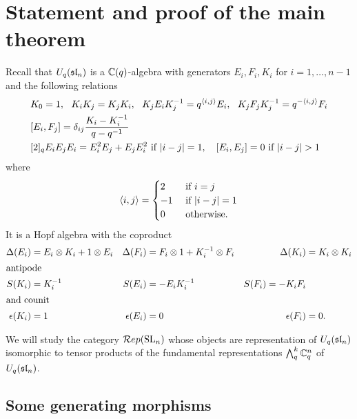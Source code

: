 \documentclass[11pt,leqno]{article}
\begin{document}
\section{Statement and proof of the main theorem}\label{sec:theorem}

Recall that $U_q(\sl_n) $ is a $ \bC(q)$-algebra with generators $ E_i, F_i, K_i $ for $ i = 1, \dots, n-1 $ and the following relations
\begin{align*}
& K_0=1, \ \ K_iK_j=K_jK_i, \ \ K_jE_iK_j^{-1} = q^{\la i,j \ra} E_i, \ \  K_jF_jK_j^{-1} = q^{-\la i,j \ra} F_i \\
& [E_i,F_j] = \delta_{ij} \frac{K_i - K_i^{-1}}{q-q^{-1}} \\
& [2]_q E_iE_jE_i = E_i^2E_j + E_jE_i^2 \text{ if } |i-j| = 1, \ \ \ [E_i,E_j]=0 \text{ if } |i-j|>1
\end{align*}
where 
$$\la i,j \ra = \begin{cases} 2 & \text{ if } i = j \\ -1 & \text{ if } |i-j|=1 \\ 0 & \text{ otherwise. } \end{cases}$$
It is a Hopf algebra with the coproduct
\begin{align} \label{eq:Hopf}
\Delta(E_i) & = E_i \otimes K_i + 1 \otimes E_i & \Delta(F_i) &= F_i \otimes 1 + K_i^{-1} \otimes F_i & \Delta(K_i) & = K_i \otimes K_i \\
\intertext{antipode}
S(K_i) & = K_i^{-1} & S(E_i) & = -E_iK_i^{-1} & S(F_i) = -K_i F_i \\
\intertext{and counit}
\epsilon(K_i) & = 1 & \epsilon(E_i) & = 0 & \epsilon(F_i) & = 0.
\end{align}


We will study the category $\Rep(\SL_n)$ whose objects are representation of $U_q(\sl_n) $ isomorphic to tensor products of the fundamental representations $\Alt^k_q \bC_q^n$ of $U_q(\sl_n)$.

\subsection{Some generating morphisms}
\label{sec:generating-morphisms}
\end{document}

